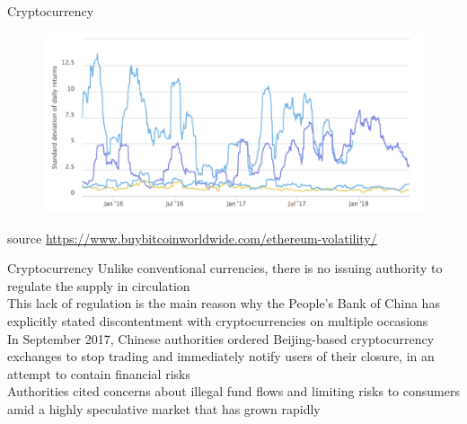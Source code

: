 \documentclass[10pt]{beamer}
\begin{document}


\begin{frame}{Cryptocurrency}
	\begin{figure}[]
		\centering
		\includegraphics  [width=4.in]{Images/vol}
	\end{figure}
	\begin{scriptsize}
		source \href{https://www.buybitcoinworldwide.com/ethereum-volatility/}{https://www.buybitcoinworldwide.com/ethereum-volatility/}
	\end{scriptsize}

\end{frame}



\begin{frame}{Cryptocurrency}
	Unlike conventional currencies, there is no issuing authority to regulate the supply in circulation \\ \vspace{3mm}
	This lack of regulation is the main reason why the People's Bank of China has explicitly stated discontentment with cryptocurrencies on multiple occasions\\ \vspace{3mm}
	In September 2017, Chinese authorities ordered Beijing-based cryptocurrency exchanges to stop trading and immediately notify users of their closure, in an attempt to contain financial risks \\ \vspace{3mm}
	Authorities cited concerns about illegal fund flows and limiting risks to consumers amid a highly speculative market that has grown rapidly
\end{frame}

\end{document}
